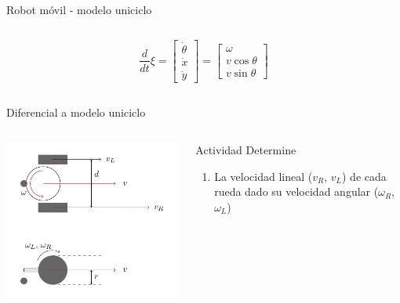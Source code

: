 \documentclass[presentation,aspectratio=169]{beamer}
\begin{document}
\begin{frame}[label={sec:orgbc4f0cd}]{Robot móvil - modelo uniciclo}
\begin{columns}
\begin{column}{0.6\columnwidth}
\[\frac{d}{dt} \xi = \begin{bmatrix} \dot{\theta}\\\dot{x}\\\dot{y} \end{bmatrix} = \begin{bmatrix} \omega\\ v\cos\theta\\v\sin\theta\end{bmatrix} \]
\end{column}
\end{columns}
\end{frame}



\begin{frame}[label={sec:orgee79b36}]{Diferencial a modelo uniciclo}
\begin{columns}
\begin{column}{0.4\columnwidth}
\begin{center}
 \includegraphics[width=1.0\linewidth]{../figures/unicycle-model-details}
\end{center}
\end{column}

\begin{column}{0.6\columnwidth}
\pause

\alert{Actividad} Determine

\begin{enumerate}
\item La velocidad lineal (\(v_R\), \(v_L\)) de cada rueda dado su velocidad angular (\(\omega_R\), \(\omega_L\))


\end{enumerate}
\end{column}
\end{columns}
\end{frame}
\end{document}
